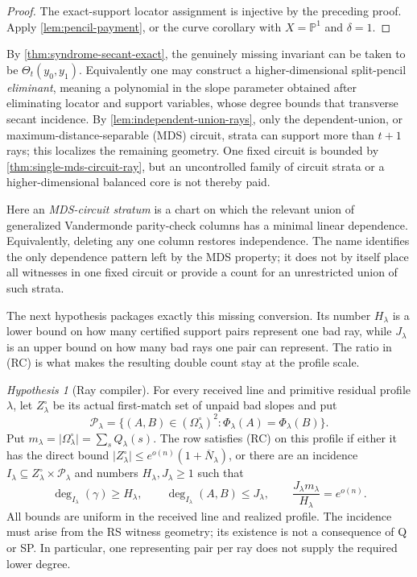 \documentclass[12pt,a4paper]{amsart}
\numberwithin{equation}{section}
\theoremstyle{remark}
\newtheorem{hypothesis}[theorem]{Hypothesis}
\newcommand{\Pj}{\mathbb P}
\newcommand{\Omc}{\Omega^{\circ}}
\newcommand{\Pcal}{\mathcal P}
\newcommand{\barN}{\overline N}
\newcommand{\abs}[1]{\lvert #1\rvert}
\begin{document}
\begin{proof}
The exact-support locator assignment is injective by the preceding proof.
Apply \cref{lem:pencil-payment}, or the curve corollary with
\(X=\Pj^1\) and \(\delta=1\).
\end{proof}

By \cref{thm:syndrome-secant-exact}, the genuinely missing invariant can
be taken to be \(\Theta_t(y_0,y_1)\).  Equivalently one may construct a
higher-dimensional split-pencil \emph{eliminant}, meaning a polynomial in
the slope parameter obtained after eliminating locator and support
variables, whose degree bounds that
transverse secant incidence.  By
\cref{lem:independent-union-rays}, only the dependent-union, or
maximum-distance-separable (MDS) circuit,
strata can support more than \(t+1\) rays; this localizes the remaining
geometry.  One fixed circuit is bounded by
\cref{thm:single-mds-circuit-ray}, but an uncontrolled family of circuit
strata or a higher-dimensional balanced core is not thereby paid.

Here an \emph{MDS-circuit stratum} is a chart on which the relevant union
of generalized Vandermonde parity-check columns has a minimal linear
dependence.  Equivalently, deleting any one column restores independence.
The name identifies the only dependence pattern left by the MDS property;
it does not by itself place all witnesses in one fixed circuit or provide
a count for an unrestricted union of such strata.

The next hypothesis packages exactly this missing conversion.  Its number
\(H_\lambda\) is a lower bound on how many certified support pairs represent
one bad ray, while \(J_\lambda\) is an upper bound on how many bad rays one
pair can represent.  The ratio in \textup{(RC)} is what makes the resulting
double count stay at the profile scale.

\begin{hypothesis}[Ray compiler]\label{hyp:ray-compiler}
For every received line and primitive residual profile \(\lambda\), let
\(Z_\lambda^\circ\) be its actual first-match set of unpaid bad slopes and
put
\[
\Pcal_\lambda=\{(A,B)\in(\Omc_\lambda)^2:
                       \Phi_\lambda(A)=\Phi_\lambda(B)\}.
\]
Put \(m_\lambda=\abs{\Omc_\lambda}=\sum_sQ_\lambda(s)\).
The row satisfies \textup{(RC)} on this profile if either it has the direct
bound \(\abs{Z_\lambda^\circ}\le e^{o(n)}(1+\barN_\lambda)\), or there are
an incidence
\(I_\lambda\subseteq Z_\lambda^\circ\times\Pcal_\lambda\) and numbers
\(H_\lambda,J_\lambda\ge1\) such that
\[
 \deg_{I_\lambda}(\gamma)\ge H_\lambda,\qquad
 \deg_{I_\lambda}(A,B)\le J_\lambda,\qquad
 \frac{J_\lambda m_\lambda}{H_\lambda}=e^{o(n)}.
 \tag{RC}\label{eq:ray-compiler}
\]
All bounds are uniform in the received line and realized profile.  The
incidence must arise from the RS witness geometry; its existence is not a
consequence of Q or SP.  In particular, one representing pair per ray does
not supply the required lower degree.
\end{hypothesis}
\end{document}
